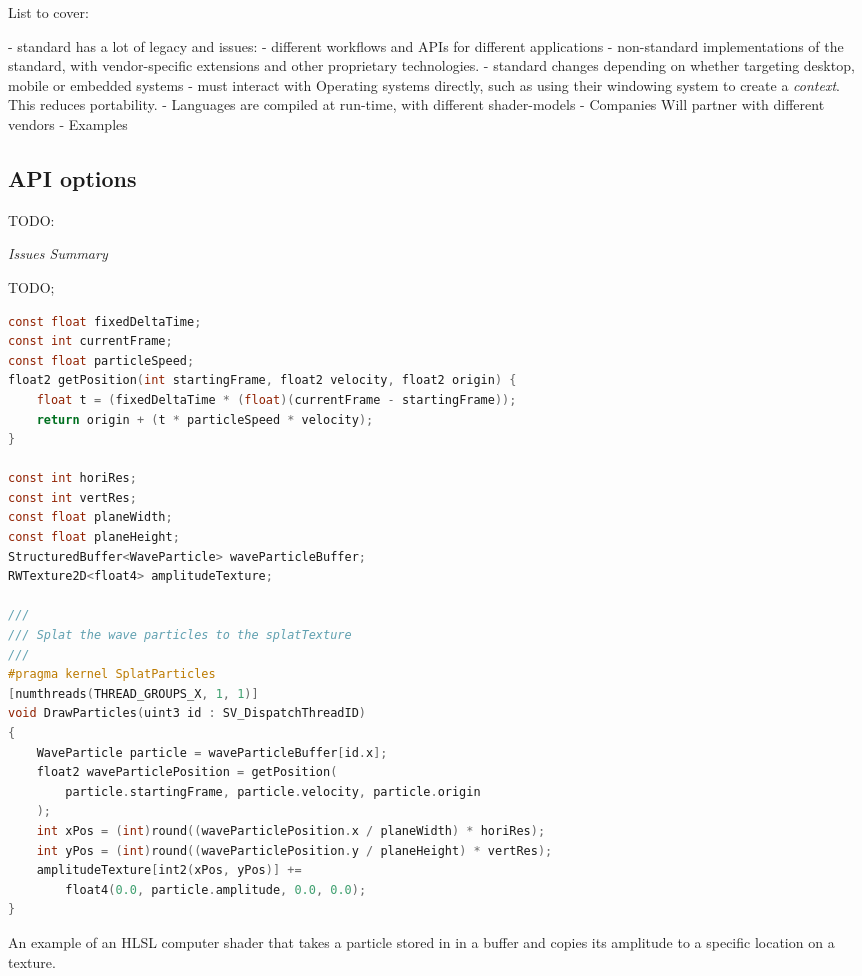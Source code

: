 \documentclass[a4paper,12pt,twoside,openright]{report}
\begin{document}
List to cover:

 - standard has a lot of legacy and issues:
    - different workflows and APIs for different applications
    - non-standard implementations of the standard, with vendor-specific extensions
    and other proprietary technologies.
    - standard changes depending on whether targeting desktop, mobile or
    embedded systems
    - must interact with Operating systems directly, such as using their windowing
    system to create a \textit{context}. This reduces portability.
    - Languages are compiled at run-time, with different shader-models
    - Companies Will partner with different vendors
    - Examples

\subsection{API options}

\label{sec:api_options}

TODO:


\textit{Issues Summary}

TODO;

\begin{lstfloat}
\begin{lstlisting}[language=C]
const float fixedDeltaTime;
const int currentFrame;
const float particleSpeed;
float2 getPosition(int startingFrame, float2 velocity, float2 origin) {
    float t = (fixedDeltaTime * (float)(currentFrame - startingFrame));
    return origin + (t * particleSpeed * velocity);
}

const int horiRes;
const int vertRes;
const float planeWidth;
const float planeHeight;
StructuredBuffer<WaveParticle> waveParticleBuffer;
RWTexture2D<float4> amplitudeTexture;

///
/// Splat the wave particles to the splatTexture
///
#pragma kernel SplatParticles
[numthreads(THREAD_GROUPS_X, 1, 1)]
void DrawParticles(uint3 id : SV_DispatchThreadID)
{
    WaveParticle particle = waveParticleBuffer[id.x];
    float2 waveParticlePosition = getPosition(
        particle.startingFrame, particle.velocity, particle.origin
    );
    int xPos = (int)round((waveParticlePosition.x / planeWidth) * horiRes);
    int yPos = (int)round((waveParticlePosition.y / planeHeight) * vertRes);
    amplitudeTexture[int2(xPos, yPos)] +=
        float4(0.0, particle.amplitude, 0.0, 0.0);
}
\end{lstlisting}
\label{lst:draw_particles}
\caption{An example of an HLSL computer shader that takes a particle stored in
in a buffer and copies its amplitude to a specific location on a texture.}
\end{lstfloat}
\end{document}
